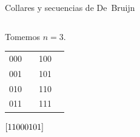 \documentclass[spanish,xcolor={table}]{beamer}
\begin{document}
\begin{frame}{Collares y secuencias de De~Bruijn}
\begin{columns}
  \begin{example}
    Tomemos $n = 3$. \vspace{-.5em}
    
    \begin{multicols}{2}
      \begin{tabular}{lclc}
        000 & & 100 & \\
        001 & & 101 & \\
        010 & & 110 & \\ 
        011 & & 111 & \\
      \end{tabular}
      \columnbreak
      \large{
        $\left[11000101\right]$
        }
    \end{multicols}
  \end{example}    
\end{columns}

\end{frame}

\end{document}
